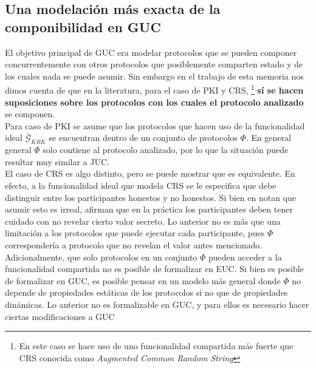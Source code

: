 \subsection{Una modelación más exacta de la componibilidad en GUC}
El objetivo principal de GUC era modelar protocolos que se pueden componer
concurrentemente con otros protocolos que posiblemente comparten estado y de los
cuales nada se puede asumir. Sin embargo en el trabajo de esta memoria nos dimos
cuenta de que en la literatura, para el caso de PKI y CRS,
\footnote{En este caso se hace uso de uno funcionalidad compartida más fuerte
que CRS conocida como \textit{Augmented Common Random String}}
\textbf{sí se hacen suposiciones sobre los protocolos con los cuales el protocolo
analizado} se componen.\\
Para caso de PKI se asume que los protocolos
que hacen uso de la funcionalidad ideal $\bar{\mathcal{G}}_{KRK}$ se encuentran
dentro de un conjunto de protocolos $\Phi$. En general general $\Phi$ solo
contiene al protocolo analizado, por lo que la situación puede resultar muy
similar a JUC.\\
El caso de CRS es algo distinto, pero se puede mostrar que es equivalente. En
efecto, a la funcionalidad ideal que modela CRS se le especifica que debe
distinguir entre los participantes honestos y no honestos. Si bien en
\cite{Walfish:2008:ESM:1467461} notan que asumir esto es irreal, afirman que en
la práctica los participantes deben tener cuidado con no revelar cierto valor
secreto. Lo anterior no es más que una limitación a los protocolos que puede
ejecutar cada participante, pues $\Phi$ correspondería a protocolo que no revelan
el valor antes mencionado.\\
Adicionalmente, que solo protocolos en un conjunto $\Phi$
pueden acceder a la funcionalidad compartida no es posible de formalizar en EUC.
Si bien es posible de formalizar en GUC, es posible pensar en un modelo más general
donde $\Phi$ no depende de propiedades estáticas de los protocolos si no que de
propiedades dinámicas. Lo anterior no es formalizable en GUC, y para ellos es necesario
hacer ciertas modificaciones a GUC
